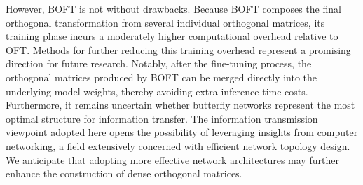 However, BOFT is not without drawbacks. Because BOFT composes the final orthogonal transformation from several individual orthogonal matrices, its training phase incurs a moderately higher computational overhead relative to OFT. Methods for further reducing this training overhead represent a promising direction for future research. Notably, after the fine-tuning process, the orthogonal matrices produced by BOFT can be merged directly into the underlying model weights, thereby avoiding extra inference time costs. Furthermore, it remains uncertain whether butterfly networks represent the most optimal structure for information transfer. The information transmission viewpoint adopted here opens the possibility of leveraging insights from computer networking, a field extensively concerned with efficient network topology design. We anticipate that adopting more effective network architectures may further enhance the construction of dense orthogonal matrices.

